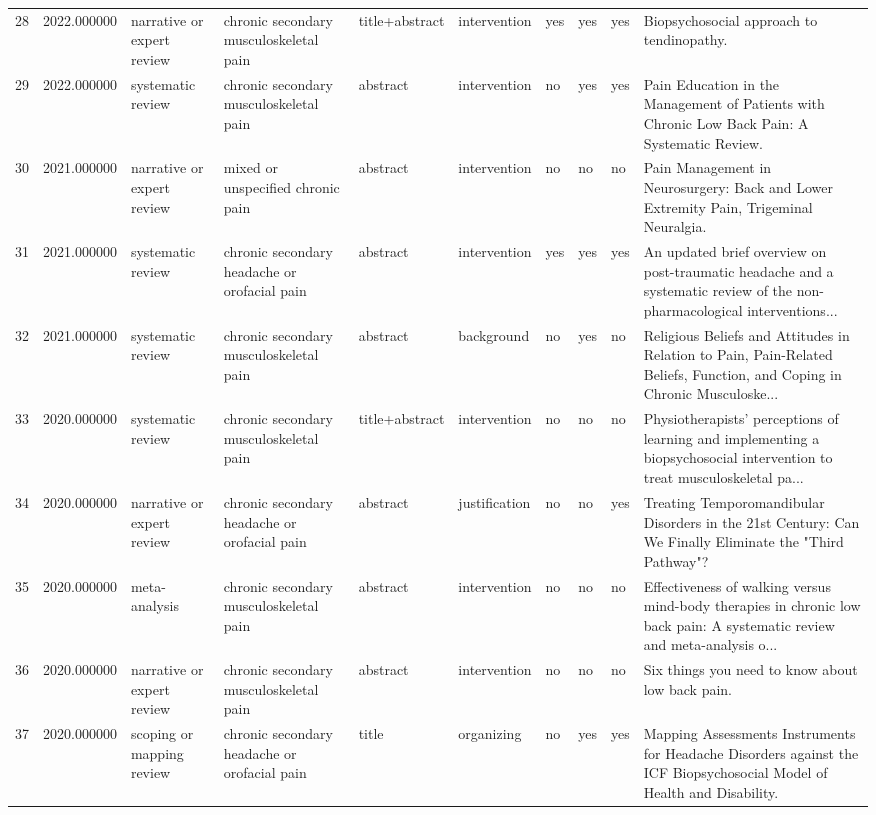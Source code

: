 \begin{longtable}{p{0.7cm}p{0.7cm}p{1.2cm}p{1.9cm}p{1.3cm}p{1.5cm}p{0.55cm}p{0.55cm}p{0.55cm}p{3.2cm}}
28 & 2022.000000 & narrative or expert review & chronic secondary musculoskeletal pain & title+abstract & intervention & yes & yes & yes & Biopsychosocial approach to tendinopathy. \\
29 & 2022.000000 & systematic review & chronic secondary musculoskeletal pain & abstract & intervention & no & yes & yes & Pain Education in the Management of Patients with Chronic Low Back Pain: A Systematic Review. \\
30 & 2021.000000 & narrative or expert review & mixed or unspecified chronic pain & abstract & intervention & no & no & no & Pain Management in Neurosurgery: Back and Lower Extremity Pain, Trigeminal Neuralgia. \\
31 & 2021.000000 & systematic review & chronic secondary headache or orofacial pain & abstract & intervention & yes & yes & yes & An updated brief overview on post-traumatic headache and a systematic review of the non-pharmacological interventions... \\
32 & 2021.000000 & systematic review & chronic secondary musculoskeletal pain & abstract & background & no & yes & no & Religious Beliefs and Attitudes in Relation to Pain, Pain-Related Beliefs, Function, and Coping in Chronic Musculoske... \\
33 & 2020.000000 & systematic review & chronic secondary musculoskeletal pain & title+abstract & intervention & no & no & no & Physiotherapists' perceptions of learning and implementing a biopsychosocial intervention to treat musculoskeletal pa... \\
34 & 2020.000000 & narrative or expert review & chronic secondary headache or orofacial pain & abstract & justification & no & no & yes & Treating Temporomandibular Disorders in the 21st Century: Can We Finally Eliminate the "Third Pathway"? \\
35 & 2020.000000 & meta-analysis & chronic secondary musculoskeletal pain & abstract & intervention & no & no & no & Effectiveness of walking versus mind-body therapies in chronic low back pain: A systematic review and meta-analysis o... \\
36 & 2020.000000 & narrative or expert review & chronic secondary musculoskeletal pain & abstract & intervention & no & no & no & Six things you need to know about low back pain. \\
37 & 2020.000000 & scoping or mapping review & chronic secondary headache or orofacial pain & title & organizing & no & yes & yes & Mapping Assessments Instruments for Headache Disorders against the ICF Biopsychosocial Model of Health and Disability. \\

\end{longtable}
